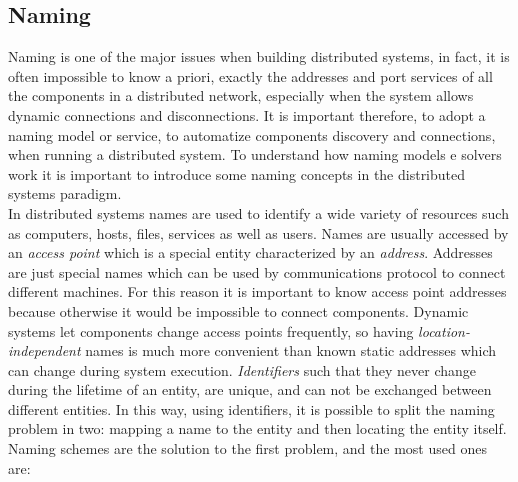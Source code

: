\subsection{Naming}
Naming is one of the major issues when building distributed systems, in fact, it is often impossible to know a priori, exactly the addresses and port services of all the components in a distributed network, especially when the system allows dynamic connections and disconnections. It is important therefore, to adopt a naming model or service, to automatize components discovery and connections, when running a distributed system. To understand how naming models e solvers work it is important to introduce some naming concepts in the distributed systems paradigm.\\
In distributed systems names are used to identify a wide variety of resources such as computers, hosts, files, services as well as users. Names are usually accessed by an \textit{access point} which is a special entity characterized by an \textit{address}. Addresses are just special names which can be used by communications protocol to connect different machines. For this reason it is important to know access point addresses because otherwise it would be impossible to connect components. Dynamic systems let components change access points frequently, so having \textit{location-independent} names is much more convenient than known static addresses which can change during system execution. \textit{Identifiers} such that they never change during the lifetime of an entity, are unique, and can not be exchanged between different entities. In this way, using identifiers, it is possible to split the naming problem in two: mapping a name to the entity and then locating the entity itself.
Naming schemes are the solution to the first problem, and the most used ones are:
